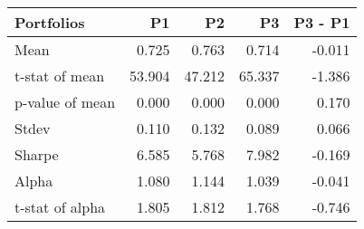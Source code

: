 \begin{tabular}{lrrrr}
\toprule
Portfolios & P1 & P2 & P3 & P3 - P1 \\
\midrule
Mean & 0.725 & 0.763 & 0.714 & -0.011 \\
t-stat of mean & 53.904 & 47.212 & 65.337 & -1.386 \\
p-value of mean & 0.000 & 0.000 & 0.000 & 0.170 \\
Stdev & 0.110 & 0.132 & 0.089 & 0.066 \\
Sharpe & 6.585 & 5.768 & 7.982 & -0.169 \\
Alpha & 1.080 & 1.144 & 1.039 & -0.041 \\
t-stat of alpha & 1.805 & 1.812 & 1.768 & -0.746 \\
\bottomrule
\end{tabular}
